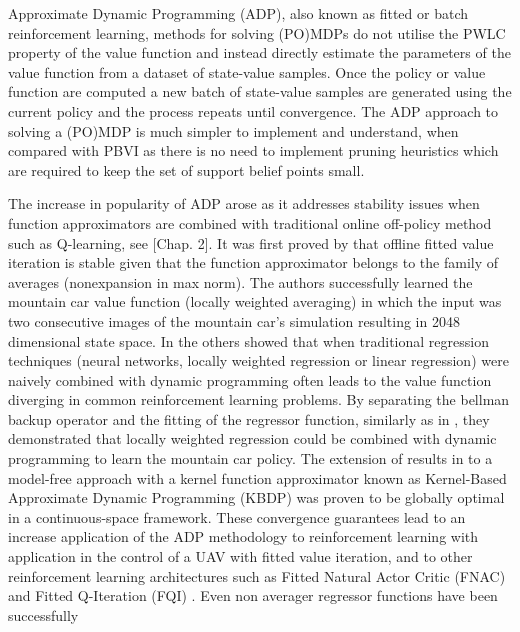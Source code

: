 \documentclass[final,5p,times,twocolumn]{elsarticle}
\begin{document}

Approximate Dynamic Programming (ADP)\cite{approx_rl_overview_2011}, also known as fitted or batch reinforcement learning, methods 
for solving (PO)MDPs do not utilise the PWLC property of the value function and instead directly estimate the parameters of 
the value function from a dataset of state-value samples. Once the policy or value function are computed a new batch of state-value samples are 
generated using the current policy and the process repeats until convergence. The ADP approach to solving a (PO)MDP is much 
simpler to implement and understand, when compared with PBVI as there is no need to implement pruning heuristics which are required 
to keep the set of support belief points small. 

The increase in popularity of ADP arose as it addresses stability issues when function approximators are combined 
with traditional online off-policy method such as Q-learning, see \cite{RL_state_art_2012}[Chap. 2].
It was first proved by \cite{stable_FA_gordon_1995} that offline fitted value iteration is stable given that the function approximator belongs to 
the family of averages (nonexpansion in max norm). The authors successfully learned the mountain car value function (locally weighted averaging) 
in which the input was two consecutive images of the mountain car's simulation resulting in 2048 dimensional state space. 
In \cite{Boyan95generalizationin} the others showed that when traditional regression techniques 
(neural networks, locally weighted regression or linear regression) were naively combined with dynamic programming  
often leads to the value function diverging in common reinforcement learning problems. By separating the bellman backup operator 
and the fitting of the regressor function, similarly as in \cite{stable_FA_gordon_1995}, they demonstrated that locally weighted 
regression could be combined with dynamic programming to learn the mountain car policy. The extension of results in \cite{stable_FA_gordon_1995}  
to a model-free approach with a kernel function approximator known as Kernel-Based Approximate Dynamic Programming (KBDP) 
\cite{kernel_rl_ormoneit_2002} was proven to be globally optimal in a continuous-space framework. These convergence guarantees 
lead to an increase application of the ADP methodology to reinforcement learning with application in the control of a UAV with fitted 
value iteration\cite{fvi_uav_2010}, and to other reinforcement learning architectures such as Fitted Natural Actor Critic 
(FNAC) \cite{Melo2008} and Fitted Q-Iteration (FQI) \cite{EGW05,fqi_nips_peter_2009}. Even non averager regressor functions have been successfully 
\end{document}
